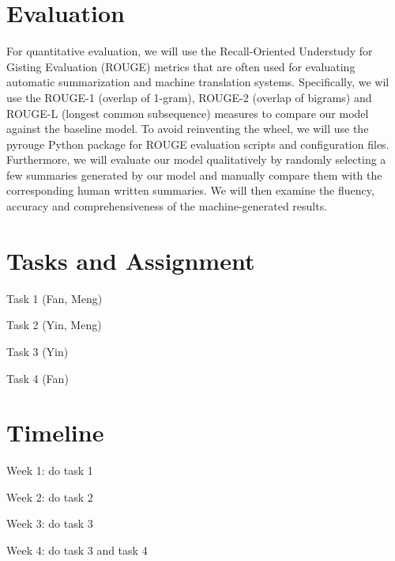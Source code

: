 \section{Evaluation}
For quantitative evaluation, we will use the Recall-Oriented Understudy for Gisting Evaluation (ROUGE) metrics that are often used for evaluating automatic summarization and machine translation systems. Specifically, we wil use the ROUGE-1 (overlap of 1-gram), ROUGE-2 (overlap of bigrams) and ROUGE-L (longest common subsequence) measures to compare our model against the baseline model. To avoid reinventing the wheel, we will use the pyrouge  Python package for ROUGE evaluation scripts and configuration files.  Furthermore, we will evaluate our model qualitatively by randomly selecting a few summaries generated by our model and manually compare them with the corresponding human written summaries. We will then examine the fluency, accuracy and comprehensiveness of the machine-generated results.

\section{Tasks and Assignment}

\begin{compactitem}
\item Task 1 (Fan, Meng)
\item Task 2 (Yin, Meng)
\item Task 3 (Yin)
\item Task 4 (Fan)
\end{compactitem}


\section{Timeline}
\begin{compactitem}
\item Week 1: do task 1
\item Week 2: do task 2
\item Week 3: do task 3
\item Week 4: do task 3 and task 4
\end{compactitem}

\newpage


